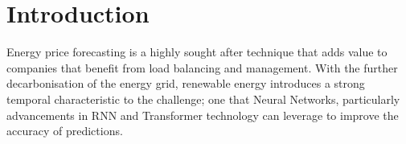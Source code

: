 \section{Introduction}
Energy price forecasting is a highly sought after technique that adds value to companies that benefit from load balancing and management. With the further decarbonisation of the energy grid, renewable energy introduces
a strong temporal characteristic to the challenge; one that Neural Networks, particularly advancements in RNN and Transformer technology can leverage to improve the accuracy of predictions.